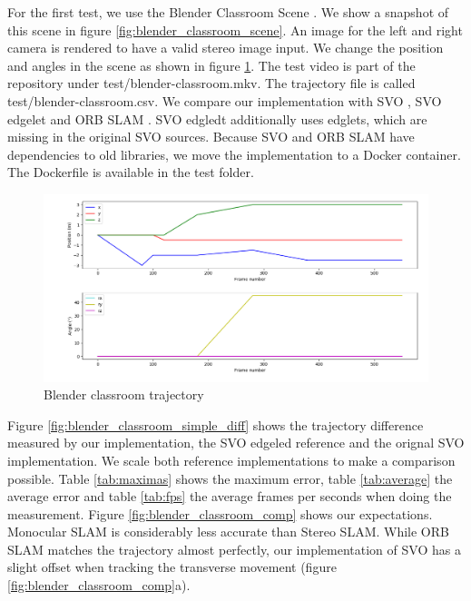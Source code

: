 \documentclass[11pt,a4paper,titlepage,oneside]{report}
\begin{document}
For the first test, we use the Blender Classroom Scene \cite{blender}. We show a snapshot of this scene in figure \ref{fig:blender_classroom_scene}. An image for the left and right camera is rendered to have a valid stereo image input. We change the position and angles in the scene as shown in figure \ref{fig:blender_classroom_simple_traj}. The test video is part of the repository under test/blender-classroom.mkv. The trajectory file is called test/blender-classroom.csv. We compare our implementation with SVO \cite{svo}, SVO edgelet \cite{svo_edglet} and ORB SLAM \cite{orbslam}. SVO edgledt additionally uses edglets, which are missing in the original SVO sources. Because SVO and ORB SLAM have dependencies to old libraries, we move the implementation to a Docker container. The Dockerfile is available in the test folder.

\begin{figure}[H]
  \centering
  \includegraphics[width=1.0\textwidth]{img/blender_classroom_simple_traj.png}
  \caption{Blender classroom trajectory}\label{fig:blender_classroom_simple_traj}
\end{figure}

Figure \ref{fig:blender_classroom_simple_diff} shows the trajectory difference measured by our implementation, the SVO edgeled reference and the orignal SVO implementation. We scale both reference implementations to make a comparison possible. Table \ref{tab:maximas} shows the maximum error, table \ref{tab:average} the average error and table \ref{tab:fps} the average frames per seconds when doing the measurement. Figure \ref{fig:blender_classroom_comp} shows our expectations. Monocular SLAM is considerably less accurate than Stereo SLAM. While ORB SLAM matches the trajectory almost perfectly, our implementation of SVO has a slight offset when tracking the transverse movement (figure \ref{fig:blender_classroom_comp}a).
\end{document}
